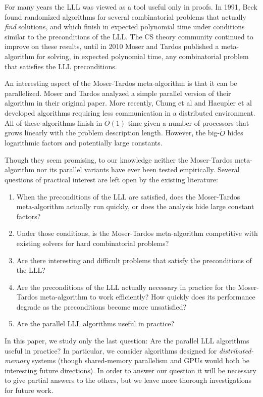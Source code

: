 \documentclass[twocolumn]{article}
\begin{document}
For many years the LLL was viewed as a tool useful only in proofs.  In 1991, Beck \cite{beck1991algorithmic} found randomized algorithms for several combinatorial problems that actually \emph{find} solutions, and which finish in expected polynomial time under conditions similar to the preconditions of the LLL.  The CS theory community continued to improve on these results, until in 2010 Moser and Tardos \cite{moser2010constructive} published a meta-algorithm for solving, in expected polynomial time, any combinatorial problem that satisfies the LLL preconditions.

An interesting aspect of the Moser-Tardos meta-algorithm is that it can be parallelized.  Moser and Tardos analyzed a simple parallel version of their algorithm in their original paper.  More recently, Chung et al \cite{chung2014distributed} and Haeupler et al \cite{haeupler2011new} developed algorithms requiring less communication in a distributed environment.  All of these algorithms finish in $\tilde{O}(1)$ time given a number of processors that grows linearly with the problem description length.  However, the big-$\tilde{O}$ hides logarithmic factors and potentially large constants.

Though they seem promising, to our knowledge neither the Moser-Tardos meta-algorithm nor its parallel variants have ever been tested empirically.  Several questions of practical interest are left open by the existing literature:
\begin{enumerate}
  \item When the preconditions of the LLL are satisfied, does the Moser-Tardos meta-algorithm actually run quickly, or does the analysis hide large constant factors?
  \item Under those conditions, is the Moser-Tardos meta-algorithm competitive with existing solvers for hard combinatorial problems?
  \item Are there interesting and difficult problems that satisfy the preconditions of the LLL?
  \item Are the preconditions of the LLL actually necessary in practice for the Moser-Tardos meta-algorithm to work efficiently?  How quickly does its performance degrade as the preconditions become more unsatisfied?
  \item Are the parallel LLL algorithms useful in practice?
\end{enumerate}

In this paper, we study only the last question: Are the parallel LLL algorithms useful in practice?  In particular, we consider algorithms designed for \emph{distributed-memory} systems (though shared-memory parallelism and GPUs would both be interesting future directions).  In order to answer our question it will be necessary to give partial answers to the others, but we leave more thorough investigations for future work.
\end{document}

